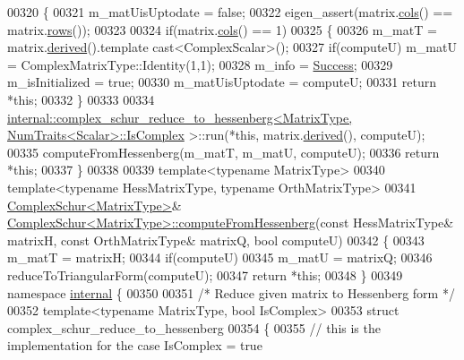 \begin{DoxyCode}
00320 \{
00321   m\_matUisUptodate = \textcolor{keyword}{false};
00322   eigen\_assert(matrix.\hyperlink{group___core___module_a7b0b45c7351847696c911ce8aa2abbdb}{cols}() == matrix.\hyperlink{group___core___module_a8141320ba8df384426c298b32b000d8e}{rows}());
00323 
00324   \textcolor{keywordflow}{if}(matrix.\hyperlink{group___core___module_a7b0b45c7351847696c911ce8aa2abbdb}{cols}() == 1)
00325   \{
00326     m\_matT = matrix.\hyperlink{group___core___module_a324b16961a11d2ecfd2d1b7dd7946545}{derived}().template cast<ComplexScalar>();
00327     \textcolor{keywordflow}{if}(computeU)  m\_matU = ComplexMatrixType::Identity(1,1);
00328     m\_info = \hyperlink{group__enums_gga85fad7b87587764e5cf6b513a9e0ee5ea52581b035f4b59c203b8ff999ef5fcea}{Success};
00329     m\_isInitialized = \textcolor{keyword}{true};
00330     m\_matUisUptodate = computeU;
00331     \textcolor{keywordflow}{return} *\textcolor{keyword}{this};
00332   \}
00333 
00334   
      \hyperlink{struct_eigen_1_1internal_1_1complex__schur__reduce__to__hessenberg}{internal::complex\_schur\_reduce\_to\_hessenberg<MatrixType, NumTraits<Scalar>::IsComplex}
      >::run(*\textcolor{keyword}{this}, matrix.\hyperlink{group___core___module_a324b16961a11d2ecfd2d1b7dd7946545}{derived}(), computeU);
00335   computeFromHessenberg(m\_matT, m\_matU, computeU);
00336   \textcolor{keywordflow}{return} *\textcolor{keyword}{this};
00337 \}
00338 
00339 \textcolor{keyword}{template}<\textcolor{keyword}{typename} MatrixType>
00340 \textcolor{keyword}{template}<\textcolor{keyword}{typename} HessMatrixType, \textcolor{keyword}{typename} OrthMatrixType>
00341 \hyperlink{group___eigenvalues___module}{ComplexSchur<MatrixType>}& 
      \hyperlink{group___eigenvalues___module_a05dfbf329047aba756a844f8fe2de314}{ComplexSchur<MatrixType>::computeFromHessenberg}(\textcolor{keyword}{const} 
      HessMatrixType& matrixH, \textcolor{keyword}{const} OrthMatrixType& matrixQ, \textcolor{keywordtype}{bool} computeU)
00342 \{
00343   m\_matT = matrixH;
00344   \textcolor{keywordflow}{if}(computeU)
00345     m\_matU = matrixQ;
00346   reduceToTriangularForm(computeU);
00347   \textcolor{keywordflow}{return} *\textcolor{keyword}{this};
00348 \}
00349 \textcolor{keyword}{namespace }\hyperlink{namespaceinternal}{internal} \{
00350 
00351 \textcolor{comment}{/* Reduce given matrix to Hessenberg form */}
00352 \textcolor{keyword}{template}<\textcolor{keyword}{typename} MatrixType, \textcolor{keywordtype}{bool} IsComplex>
00353 \textcolor{keyword}{struct }complex\_schur\_reduce\_to\_hessenberg
00354 \{
00355   \textcolor{comment}{// this is the implementation for the case IsComplex = true}

\end{DoxyCode}
